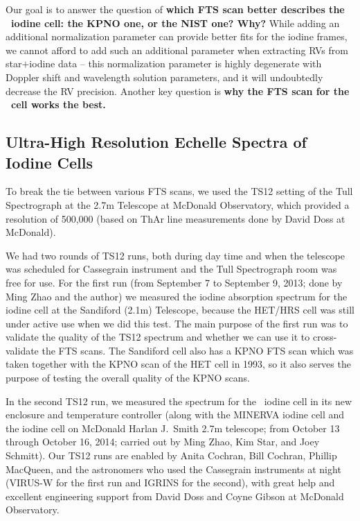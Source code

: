 Our goal is to answer the question of {\bf which FTS scan better describes
the \het\ iodine cell: the KPNO one, or the NIST one? Why?} While adding an
additional normalization parameter can provide better fits for the
iodine frames, we cannot afford to add such an additional parameter
when extracting RVs from star$+$iodine data -- this normalization
parameter is highly degenerate with Doppler shift and wavelength
solution parameters, and it will undoubtedly decrease the RV
precision. Another key question is {\bf why the FTS scan for the \keck\
cell works the best.}


\subsection{Ultra-High Resolution Echelle Spectra of Iodine Cells}

To break the tie between various FTS scans, we used the TS12 setting
of the Tull Spectrograph at the 2.7m Telescope at McDonald
Observatory, which provided a resolution of 500,000 (based on ThAr
line measurements done by David Doss at McDonald). 

We had two rounds of TS12 runs, both during day time and when the
telescope was scheduled for Cassegrain instrument and the Tull
Spectrograph room was free for use. For the first run (from September
7 to September 9, 2013; done by Ming Zhao and the author) we measured
the iodine absorption spectrum for the iodine cell at the Sandiford
(2.1m) Telescope, because the HET/HRS cell was still under active use
when we did this test. The main purpose of the first run was to
validate the quality of the TS12 spectrum and whether we can use it to
cross-validate the FTS scans. The Sandiford cell also has a KPNO FTS
scan which was taken together with the KPNO scan of the HET cell in
1993, so it also serves the purpose of testing the overall quality of
the KPNO scans.

In the second TS12 run, we measured the spectrum for the \het\ iodine
cell in its new enclosure and temperature controller (along with the
MINERVA iodine cell and the iodine cell on McDonald Harlan J.\ Smith
2.7m telescope; from October 13 through October 16, 2014; carried out
by Ming Zhao, Kim Star, and Joey Schmitt). Our TS12 runs are enabled
by Anita Cochran, Bill Cochran, Phillip MacQueen, and the astronomers
who used the Cassegrain instruments at night (VIRUS-W for the first
run and IGRINS for the second), with great help and excellent
engineering support from David Doss and Coyne Gibson at McDonald
Observatory.

